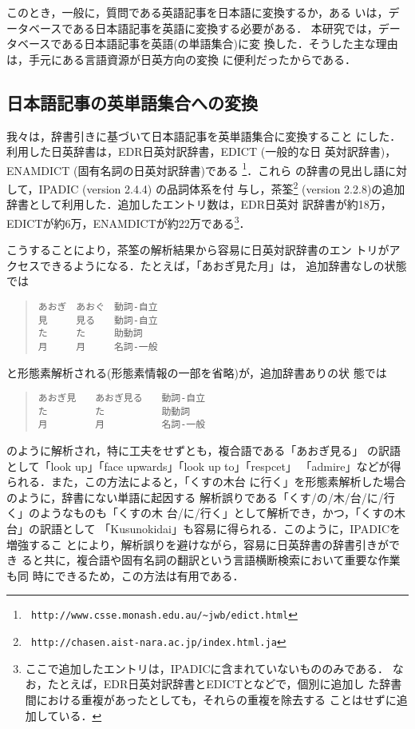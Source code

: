 このとき，一般に，質問である英語記事を日本語に変換するか，ある
いは，データベースである日本語記事を英語に変換する必要がある．
本研究では，データベースである日本語記事を英語(の単語集合)に変
換した．そうした主な理由は，手元にある言語資源が日英方向の変換
に便利だったからである．

\subsection{日本語記事の英単語集合への変換}
\label{sec:artj2e}

我々は，辞書引きに基づいて日本語記事を英単語集合に変換すること
にした．利用した日英辞書は，EDR日英対訳辞書，EDICT (一般的な日
英対訳辞書)，ENAMDICT (固有名詞の日英対訳辞書)である
\footnote{{\tt
    http://www.csse.monash.edu.au/\~{}jwb/edict.html}}．これら
の辞書の見出し語に対して，IPADIC (version 2.4.4) の品詞体系を付
与し，茶筌\footnote{{\tt
    http://chasen.aist-nara.ac.jp/index.html.ja}} (version
2.2.8)の追加辞書として利用した．追加したエントリ数は，EDR日英対
訳辞書が約18万，EDICTが約6万，ENAMDICTが約22万である\footnote
{ここで追加したエントリは，IPADICに含まれていないもののみである．
  なお，たとえば，EDR日英対訳辞書とEDICTとなどで，個別に追加し
  た辞書間における重複があったとしても，それらの重複を除去する
  ことはせずに追加している．}．

こうすることにより，茶筌の解析結果から容易に日英対訳辞書のエン
トリがアクセスできるようになる．たとえば，「あおぎ見た月」は，
追加辞書なしの状態では
\begin{quote}
  \footnotesize
\begin{verbatim}
あおぎ　あおぐ　動詞-自立
見　　　見る　　動詞-自立
た　　　た　　　助動詞
月　　　月　　　名詞-一般               
\end{verbatim}
\end{quote}
と形態素解析される(形態素情報の一部を省略)が，追加辞書ありの状
態では
\begin{quote}
  \footnotesize
\begin{verbatim}
あおぎ見　　あおぎ見る　　動詞-自立
た　　　　　た　　　　　　助動詞
月　　　　　月　　　　　　名詞-一般               
\end{verbatim}
\end{quote}
のように解析され，特に工夫をせずとも，複合語である「あおぎ見る」
の訳語として「look up」「face upwards」「look up to」「respcet」
「admire」などが得られる．また，この方法によると，「くすの木台
に行く」を形態素解析した場合のように，辞書にない単語に起因する
解析誤りである「くす/の/木/台/に/行く」のようなものも「くすの木
台/に/行く」として解析でき，かつ，「くすの木台」の訳語として
「Kusunokidai」も容易に得られる．このように，IPADICを増強するこ
とにより，解析誤りを避けながら，容易に日英辞書の辞書引きができ
ると共に，複合語や固有名詞の翻訳という言語横断検索において重要な作業も同
時にできるため，この方法は有用である．

